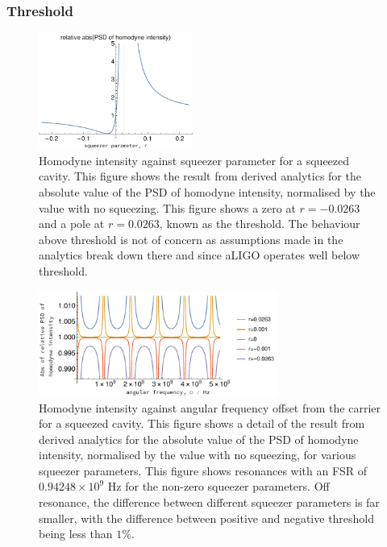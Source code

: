 \documentclass[aps,pra,superscriptaddress,reprint,nofootinbib]{revtex4-1}
\begin{document}
\subsubsection{Threshold}

\begin{figure}[ht]
	\begin{center}
	\includegraphics[width=0.45\textwidth]{figures/not_main_PSD_vs_r.pdf}
	\end{center}
	\caption{Homodyne intensity against squeezer parameter for a squeezed cavity. This figure shows the result from derived analytics for the absolute value of the PSD of homodyne intensity, normalised by the value with no squeezing. This figure shows a zero at $r = - 0.0263$ and a pole at $r = 0.0263$, known as the threshold. The behaviour above threshold is not of concern as assumptions made in the analytics break down there and since aLIGO operates well below threshold.}
	\label{fig:not_main_PSD_vs_r}
\end{figure}

\begin{figure}
	\begin{center}
	\includegraphics[width=0.7\textwidth]{figures/not_main_PSD_vs_freq.pdf}
	\end{center}
	\caption{Homodyne intensity against angular frequency offset from the carrier for a squeezed cavity. This figure shows a detail of the result from derived analytics for the absolute value of the PSD of homodyne intensity, normalised by the value with no squeezing, for various squeezer parameters. This figure shows resonances with an FSR of $0.94248 \times 10^9$ Hz for the non-zero squeezer parameters. Off resonance, the difference between different squeezer parameters is far smaller, with the difference between positive and negative threshold being less than $1\%$.}
	\label{fig:not_main_PSD_vs_freq}
\end{figure}
\end{document}
